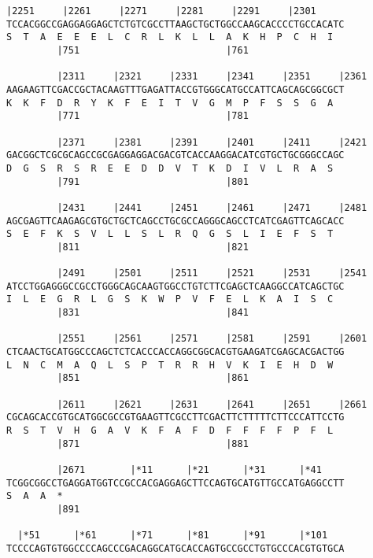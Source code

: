 \documentclass{article}
\begin{document}
\newpage
\begin{Verbatim}[fontfamily=courier]
         |2251     |2261     |2271     |2281     |2291     |2301
TCCACGGCCGAGGAGGAGCTCTGTCGCCTTAAGCTGCTGGCCAAGCACCCCTGCCACATC
S  T  A  E  E  E  L  C  R  L  K  L  L  A  K  H  P  C  H  I  
         |751                          |761                 

         |2311     |2321     |2331     |2341     |2351     |2361
AAGAAGTTCGACCGCTACAAGTTTGAGATTACCGTGGGCATGCCATTCAGCAGCGGCGCT
K  K  F  D  R  Y  K  F  E  I  T  V  G  M  P  F  S  S  G  A  
         |771                          |781                 

         |2371     |2381     |2391     |2401     |2411     |2421
GACGGCTCGCGCAGCCGCGAGGAGGACGACGTCACCAAGGACATCGTGCTGCGGGCCAGC
D  G  S  R  S  R  E  E  D  D  V  T  K  D  I  V  L  R  A  S  
         |791                          |801                 

         |2431     |2441     |2451     |2461     |2471     |2481
AGCGAGTTCAAGAGCGTGCTGCTCAGCCTGCGCCAGGGCAGCCTCATCGAGTTCAGCACC
S  E  F  K  S  V  L  L  S  L  R  Q  G  S  L  I  E  F  S  T  
         |811                          |821                 

         |2491     |2501     |2511     |2521     |2531     |2541
ATCCTGGAGGGCCGCCTGGGCAGCAAGTGGCCTGTCTTCGAGCTCAAGGCCATCAGCTGC
I  L  E  G  R  L  G  S  K  W  P  V  F  E  L  K  A  I  S  C  
         |831                          |841                 

         |2551     |2561     |2571     |2581     |2591     |2601
CTCAACTGCATGGCCCAGCTCTCACCCACCAGGCGGCACGTGAAGATCGAGCACGACTGG
L  N  C  M  A  Q  L  S  P  T  R  R  H  V  K  I  E  H  D  W  
         |851                          |861                 

         |2611     |2621     |2631     |2641     |2651     |2661
CGCAGCACCGTGCATGGCGCCGTGAAGTTCGCCTTCGACTTCTTTTTCTTCCCATTCCTG
R  S  T  V  H  G  A  V  K  F  A  F  D  F  F  F  F  P  F  L  
         |871                          |881                 

         |2671        |*11      |*21      |*31      |*41    
TCGGCGGCCTGAGGATGGTCCGCCACGAGGAGCTTCCAGTGCATGTTGCCATGAGGCCTT
S  A  A  *   
         |891                                               

  |*51      |*61      |*71      |*81      |*91      |*101   
TCCCCAGTGTGGCCCCAGCCCGACAGGCATGCACCAGTGCCGCCTGTGCCCACGTGTGCA

\end{Verbatim}
\newpage
\end{document}
